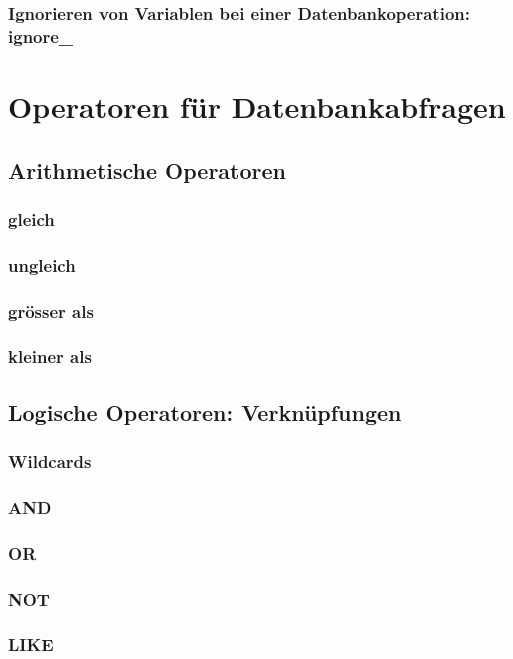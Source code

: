 \subsubsection{Ignorieren von Variablen bei einer Datenbankoperation: ignore\_}

\section{Operatoren f\"ur Datenbankabfragen}

\subsection{Arithmetische Operatoren}
\subsubsection{gleich}
\subsubsection{ungleich}
\subsubsection{gr\"osser als}
\subsubsection{kleiner als}

\subsection{Logische Operatoren: Verkn\"upfungen}
\subsubsection{Wildcards}
\subsubsection{AND}
\subsubsection{OR}
\subsubsection{NOT}
\subsubsection{LIKE}

